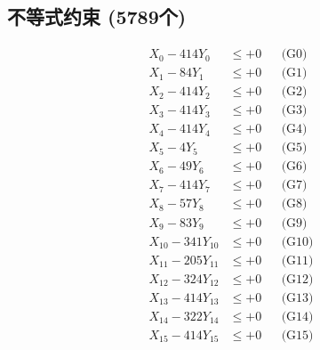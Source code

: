\documentclass[a4paper,10pt]{article}
\begin{document}
\subsection{不等式约束 (5789个)}

\allowdisplaybreaks
{\small
\begin{align}
\allowbreak
\allowbreak
\allowbreak
\allowbreak
\allowbreak
\allowbreak
\allowbreak
\allowbreak
\allowbreak
\allowbreak
\allowbreak
\allowbreak
\allowbreak
\allowbreak
\allowbreak
\allowbreak
\allowbreak
\allowbreak
\allowbreak
\allowbreak
\allowbreak
\allowbreak
\allowbreak
\allowbreak
\allowbreak
\allowbreak
\allowbreak
\allowbreak
\allowbreak
\allowbreak
\allowbreak
\allowbreak
\allowbreak
\allowbreak
\allowbreak
\allowbreak
\allowbreak
\allowbreak
\allowbreak
\allowbreak
\allowbreak
\allowbreak
\allowbreak
\allowbreak
\allowbreak
\allowbreak
\allowbreak
\allowbreak
\allowbreak
\allowbreak
\allowbreak
\allowbreak
\allowbreak
\allowbreak
\allowbreak
\allowbreak
\allowbreak
\allowbreak
\allowbreak
\allowbreak
\allowbreak
\allowbreak
\allowbreak
\allowbreak
\allowbreak
\allowbreak
\allowbreak
\allowbreak
\allowbreak
\allowbreak
\allowbreak
\allowbreak
\allowbreak
\allowbreak
\allowbreak
\allowbreak
\allowbreak
\allowbreak
X_{0} - 414Y_{0} &\leq +0 && \text{(G0)} \\
\allowbreak
X_{1} - 84Y_{1} &\leq +0 && \text{(G1)} \\
X_{2} - 414Y_{2} &\leq +0 && \text{(G2)} \\
X_{3} - 414Y_{3} &\leq +0 && \text{(G3)} \\
X_{4} - 414Y_{4} &\leq +0 && \text{(G4)} \\
X_{5} - 4Y_{5} &\leq +0 && \text{(G5)} \\
X_{6} - 49Y_{6} &\leq +0 && \text{(G6)} \\
X_{7} - 414Y_{7} &\leq +0 && \text{(G7)} \\
X_{8} - 57Y_{8} &\leq +0 && \text{(G8)} \\
X_{9} - 83Y_{9} &\leq +0 && \text{(G9)} \\
X_{10} - 341Y_{10} &\leq +0 && \text{(G10)} \\
\allowbreak
X_{11} - 205Y_{11} &\leq +0 && \text{(G11)} \\
X_{12} - 324Y_{12} &\leq +0 && \text{(G12)} \\
X_{13} - 414Y_{13} &\leq +0 && \text{(G13)} \\
X_{14} - 322Y_{14} &\leq +0 && \text{(G14)} \\
X_{15} - 414Y_{15} &\leq +0 && \text{(G15)} \\

\end{align}}
\end{document}
